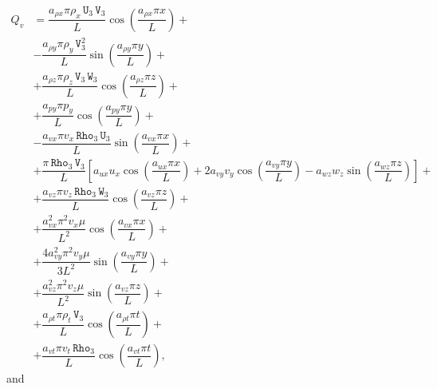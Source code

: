 \documentclass[10pt]{article}
\newcommand{\Rho}{\,\mathtt{Rho}}
\newcommand{\U}{\,\mathtt{U}}
\newcommand{\V}{\,\mathtt{V}}
\newcommand{\W}{\,\mathtt{W}}
\begin{document}
\begin{equation}
 \begin{split}
Q_v &= \dfrac{a_{\rho x} \pi \rho_x \U_3 \V_3 }{L}\cos\left(\dfrac{a_{\rho x} \pi x}{L}\right)+\\
&-\dfrac{a_{\rho y} \pi \rho_y \V_3^2 }{L}\sin\left(\dfrac{a_{\rho y} \pi y}{L}\right)+\\
&+\dfrac{a_{\rho z} \pi \rho_z \V_3 \W_3 }{L}\cos\left(\dfrac{a_{\rho z}\pi z }{L}\right)+\\
&+\dfrac{a_{py} \pi p_y }{L}\cos\left(\dfrac{a_{py} \pi y}{L}\right)+\\
&-\dfrac{a_{vx} \pi v_x \Rho_3 \U_3 }{L}\sin\left(\dfrac{a_{vx} \pi x}{L}\right)+\\
&+\dfrac{\pi \Rho_3 \V_3}{L}\left[a_{ux} u_x \cos\left(\dfrac{a_{ux} \pi x}{L}\right)+2 a_{vy} v_y \cos\left(\dfrac{a_{vy} \pi y}{L}\right)-a_{wz} w_z \sin\left(\dfrac{a_{wz}\pi z }{L}\right)\right]+\\
&+\dfrac{a_{vz} \pi v_z \Rho_3 \W_3 }{L}\cos\left(\dfrac{a_{vz}\pi z }{L}\right)+\\
&+\dfrac{a_{vx}^2 \pi^2 v_x \mu }{L^2}\cos\left(\dfrac{a_{vx} \pi x}{L}\right) +\\
&+\dfrac{4a_{vy}^2 \pi^2 v_y \mu  }{3L^2}\sin\left(\dfrac{a_{vy} \pi y}{L}\right) +\\
&+\dfrac{a_{vz}^2 \pi^2 v_z \mu }{L^2}\sin\left(\dfrac{a_{vz} \pi z}{L}\right)+\\
&+\dfrac{a_{\rho t} \pi \rho_t \V_3 }{L}\cos\left(\dfrac{a_{\rho t} \pi t}{L}\right)+\\
&+ \dfrac{a_{vt} \pi v_t  \Rho_3}{L}\cos\left(\dfrac{a_{vt} \pi t}{L}\right) ,
 \end{split}
\end{equation}
and
\end{document}
